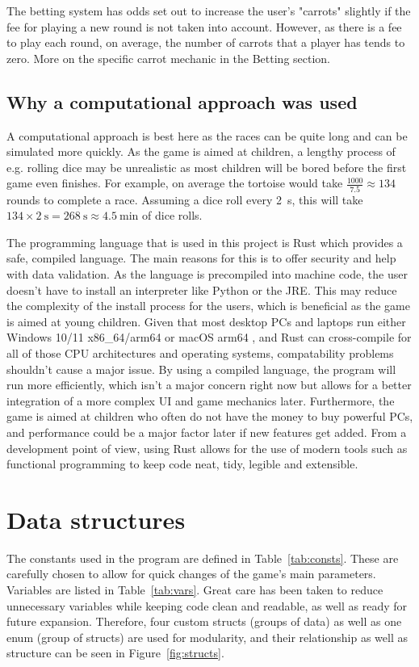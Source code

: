 \documentclass[11pt]{article}
\begin{document}
The betting system has odds set out to increase the user's "carrots" slightly if the fee for
playing a new round is not taken into account. However, as there is a fee to play each round,
on average, the number of carrots that a player has tends to zero. More on the specific carrot
mechanic in the Betting section.

\subsection{Why a computational approach was used}
\label{sec:approach}
A computational approach is best here as the races can be quite long and can be simulated more
quickly. As the game is aimed at children, a lengthy process of e.g. rolling dice may be unrealistic
as most children will be bored before the first game even finishes. For example, on average the
tortoise would take \(\frac{1000}{7.5} \approx 134\) rounds to complete a race. Assuming a dice roll
every \qty{2}{\second}, this will take
\(134 \times \qty{2}{\second} = \qty{268}{\second} \approx \qty{4.5}{\minute}\) of dice rolls.

The programming language that is used in this project is Rust \cite{rust} which provides a
safe, compiled language. The main reasons for this is to offer security and help with data
validation. As the language is precompiled into machine code, the user doesn't have to install
an interpreter like Python or the JRE. This may reduce the complexity of the install process
for the users, which is beneficial as the game is aimed at young children. Given that most
desktop PCs and laptops run either Windows 10/11 x86\_64/arm64 or macOS arm64 \cite{os},
and Rust can cross-compile for all of those CPU architectures and operating systems, compatability
problems shouldn't cause a major issue. By using a compiled language, the program will run
more efficiently, which isn't a major concern right now but allows for a better integration of a
more complex UI and game mechanics later. Furthermore, the game is aimed at children who often do
not have the money to buy powerful PCs, and performance could be a major factor later if new
features get added. From a development point of view, using Rust allows for the use of modern tools
such as functional programming to keep code neat, tidy, legible and extensible.

\section{Data structures}
The constants used in the program are defined in Table~\ref{tab:consts}. These are carefully chosen
to allow for quick changes of the game's main parameters. Variables are listed in Table~\ref{tab:vars}.
Great care has been taken to reduce unnecessary variables while keeping code clean and readable, as
well as ready for future expansion. Therefore, four custom structs (groups of data) as well as one
enum (group of structs) are used for modularity, and their relationship as well as structure can be
seen in Figure~\ref{fig:structs}.
\end{document}
